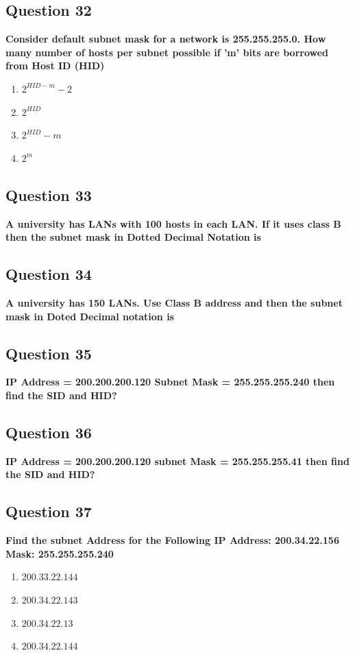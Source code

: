 \documentclass[12pt]{article}
\begin{document}
\subsection*{Question 32}
\textbf{Consider default subnet mask for a network is  255.255.255.0. How many number of hosts per subnet possible if 'm' bits are borrowed from Host ID (HID)}
\begin{enumerate}
    \item $2^{HID-m}-2$
    \item $2^{HID}$
    \item $2^{HID}-m$
    \item $2^m$
\end{enumerate}

\subsection*{Question 33}
\textbf{A university has LANs with 100 hosts in each LAN. If it uses class B then the subnet mask in Dotted Decimal Notation is}

\subsection*{Question 34}
\textbf{A university has 150 LANs. Use Class B address and then the subnet mask in Doted Decimal notation is}

\subsection*{Question 35}
\textbf{IP Address = 200.200.200.120 Subnet Mask = 255.255.255.240 then find the SID and HID?}

\subsection*{Question 36}
\textbf{IP Address = 200.200.200.120 subnet Mask = 255.255.255.41 then find the SID and HID?}

\subsection*{Question 37}
\textbf{Find the subnet Address for the Following IP Address: 200.34.22.156 Mask: 255.255.255.240}
\begin{enumerate}
    \item $200.33.22.144$
    \item $200.34.22.143$
    \item $200.34.22.13$
    \item $200.34.22.144$
\end{enumerate}
\end{document}
